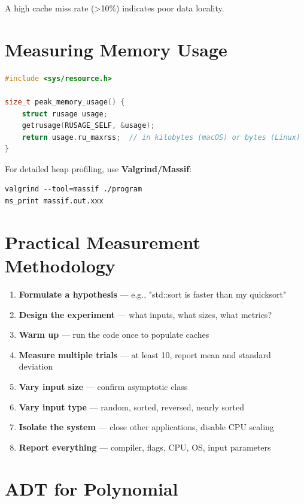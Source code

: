 A high cache miss rate (>10\%) indicates poor data locality.

\section{Measuring Memory Usage}

\begin{lstlisting}[language=C++]
#include <sys/resource.h>

size_t peak_memory_usage() {
    struct rusage usage;
    getrusage(RUSAGE_SELF, &usage);
    return usage.ru_maxrss;  // in kilobytes (macOS) or bytes (Linux)
}
\end{lstlisting}

For detailed heap profiling, use \textbf{Valgrind/Massif}:

\begin{lstlisting}
valgrind --tool=massif ./program
ms_print massif.out.xxx
\end{lstlisting}

\section{Practical Measurement Methodology}

\begin{enumerate}
\item \textbf{Formulate a hypothesis} — e.g., "std::sort is faster than my quicksort"
\item \textbf{Design the experiment} — what inputs, what sizes, what metrics?
\item \textbf{Warm up} — run the code once to populate caches
\item \textbf{Measure multiple trials} — at least 10, report mean and standard deviation
\item \textbf{Vary input size} — confirm asymptotic class
\item \textbf{Vary input type} — random, sorted, reversed, nearly sorted
\item \textbf{Isolate the system} — close other applications, disable CPU scaling
\item \textbf{Report everything} — compiler, flags, CPU, OS, input parameters
\end{enumerate}

\section{ADT for Polynomial}


